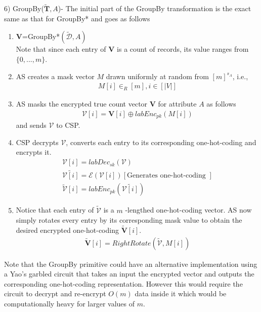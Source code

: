 6) \textsf{GroupBy}($\mathbf{\tilde{T}},A$)- The initial part of the  \textsf{GroupBy} transformation is the exact same as that  for \textsf{GroupBy*} and goes as follows   \begin{enumerate}[label=\alph*)]\item $\mathbf{V}$=\textsf{GroupBy*}$(\boldsymbol{\tilde{\mathcal{D}}},A)$ \\Note that since each entry of $\mathbf{V}$ is a count of records, its value ranges from $\{0,...,m\}$. \item \textsf{AS} creates a mask vector $M$ drawn uniformly at random from $[m]^{s_A}$, i.e.,  \begin{gather*} M[i] \in_R [m], i \in [|V|]\end{gather*} \item \textsf{AS} masks the encrypted true count vector $\mathbf{V}$ for attribute $A$ as follows \begin{gather*}\boldsymbol{\mathcal{V}}[i]= \mathbf{V}[i] \oplus labEnc_{pk}(M[i])\end{gather*} and sends $\boldsymbol{\mathcal{V}}$ to \textsf{CSP}.\item \textsf{CSP} decrypts $\boldsymbol{\mathcal{V}}$, converts each entry to its corresponding one-hot-coding and encrypts it. \begin{gather*}\mathcal{V}[i]=labDec_{sk}(\boldsymbol{\mathcal{V}})\\\tilde{\mathcal{V}[i]}=\mathcal{E}(\mathcal{V}[i])[\text{Generates one-hot-coding  }]\\\boldsymbol{\tilde{\mathcal{V}}}[i]=labEnc_{pk}(\tilde{\mathcal{V}[i]})\end{gather*}\item Notice that each entry of $\boldsymbol{\tilde{\mathcal{V}}}$ is a $m$ -lengthed one-hot-coding vector. \textsf{AS} now simply rotates every entry by its corresponding mask value to obtain the desired  encrypted one-hot-coding $\boldsymbol{\tilde{V}}[i]$. \begin{gather*}\boldsymbol{\tilde{V}}[i]=RightRotate(\boldsymbol{\tilde{\mathcal{V}}},M[i])\end{gather*}  \end{enumerate} Note that the \textsf{GroupBy} primitive could have an alternative implementation using a Yao's garbled circuit that takes an input the encrypted vector and outputs the corresponding one-hot-coding representation. However this would require the circuit to decrypt and re-encrypt $O(m)$ data inside it which would be computationally heavy for larger values of $m$. 


